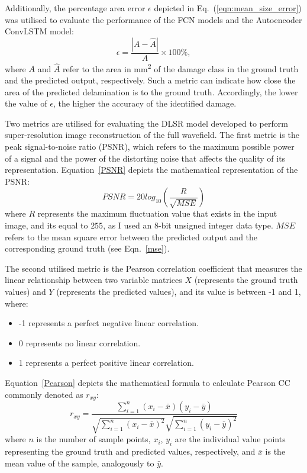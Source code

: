 Additionally, the percentage area error $\epsilon$ depicted in Eq.~(\ref{eqn:mean_size_error}) was utilised to evaluate the performance of the FCN models and the Autoencoder ConvLSTM model:
\begin{equation}
	\epsilon=\frac{|A-\hat{A}|}{A} \times 100\%,
	\label{eqn:mean_size_error}
\end{equation}
where \(A\) and \(\hat{A}\) refer to the area in mm\textsuperscript{2} of the damage class in the ground truth and the predicted output, respectively.
Such a metric can indicate how close the area of the predicted delamination is to the ground truth.
Accordingly, the lower the value of $\epsilon$, the higher the accuracy of the identified damage. 

Two metrics are utilised for evaluating the DLSR model developed to perform super-resolution image reconstruction of the full wavefield.
The first metric is the peak signal-to-noise ratio (PSNR), which refers to the maximum possible power of a signal and the power of the distorting noise that affects the quality of its representation.
Equation~\ref{PSNR} depicts the mathematical representation of the PSNR:
\begin{equation}
	PSNR=20log_{10}\left(\frac{R}{\sqrt{MSE}}\right)
	\label{PSNR}
\end{equation}
where \(R\) represents the maximum fluctuation value that exists in the input image, and its equal to \(255\), as I used an 8-bit unsigned integer data type.
\(MSE\) refers to the mean square error between the predicted output and the corresponding ground truth (see Eqn.~\ref{mse}).

The second utilised metric is the Pearson correlation coefficient that measures the linear relationship between two variable matrices \textbf{\(X\)} (represents the ground truth values) and \textbf{\(Y\)} (represents the predicted values), and its value is between -1 and 1, where:
\begin{itemize}
	\item -1 represents a perfect negative linear correlation.
	\item 0 represents no linear correlation.
	\item 1 represents a perfect positive linear correlation.
\end{itemize}
Equation~\ref{Pearson} depicts the mathematical formula to calculate Pearson CC commonly denoted as \(r_{xy}\):
\begin{equation}
	r_{xy} = \frac{\sum_{i=1}^{n}(x_i - \bar{x})(y_i-\bar{y})}{\sqrt{\sum_{i=1}^{n}(x_i - \bar{x})^2}\sqrt{\sum_{i=1}^{n}(y_i - \bar{y})^2}}
	\label{Pearson}
\end{equation}
where \(n\) is the number of sample points, \(x_i\), \(y_i\) are the individual value points representing the ground truth and predicted values, respectively, and \(\bar{x}\) is the mean value of the sample, analogously to \(\bar{y}\).



